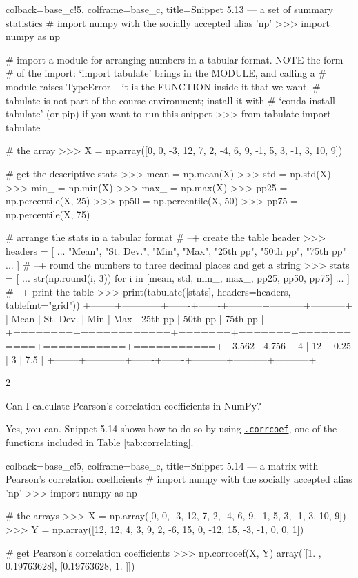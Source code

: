 \documentclass[a4paper,11pt]{book}
\newcommand{\question}[1]{%
    \begin{tcolorbox}[colback=comp_c!10,colframe=comp_c,sidebyside align=top,width=\linewidth,before skip=1ex]
        #1
    \end{tcolorbox}
    \switchcolumn%
}
\newcommand{\note}[1]{%
    \begin{tcolorbox}[colback=white!0,colframe=white!10,width=\linewidth,before skip=1ex]
        #1
    \end{tcolorbox}
}
\begin{document}
\begin{pythoncode}[linenos=true,]{colback=base_c!5, colframe=base_c, title=\sffamily Snippet 5.13 --- a set of summary statistics}
# import numpy with the socially accepted alias 'np'
>>> import numpy as np

# import a module for arranging numbers in a tabular format. NOTE the form
# of the import: `import tabulate' brings in the MODULE, and calling a
# module raises TypeError -- it is the FUNCTION inside it that we want.
# tabulate is not part of the course environment; install it with
# `conda install tabulate' (or pip) if you want to run this snippet
>>> from tabulate import tabulate

# the array
>>> X = np.array([0, 0, -3, 12, 7, 2, -4, 6, 9, -1, 5, 3, -1, 3, 10, 9])

# get the descriptive stats
>>> mean = np.mean(X)
>>> std = np.std(X)
>>> min_ = np.min(X)
>>> max_ = np.max(X)
>>> pp25 = np.percentile(X, 25)
>>> pp50 = np.percentile(X, 50)
>>> pp75 = np.percentile(X, 75)

# arrange the stats in a tabular format
# --+ create the table header
>>> headers = [
...     "Mean", "St. Dev.", "Min", "Max", "25th pp", "50th pp", "75th pp"
...     ]
# --+ round the numbers to three decimal places and get a string
>>> stats = [
...     str(np.round(i, 3)) for i in [mean, std, min_, max_, pp25, pp50, pp75]
...     ]
# --+ print the table
>>> print(tabulate([stats], headers=headers, tablefmt="grid"))
+--------+------------+-------+-------+-----------+-----------+-----------+
|   Mean |   St. Dev. |   Min |   Max |   25th pp |   50th pp |   75th pp |
+========+============+=======+=======+===========+===========+===========+
|  3.562 |      4.756 |    -4 |    12 |     -0.25 |         3 |       7.5 |
+--------+------------+-------+-------+-----------+-----------+-----------+
\end{pythoncode}

\begin{paracol}{2}
	\question{\raggedright Can I calculate Pearson's correlation coefficients in NumPy?}
	\note{Yes, you can. Snippet 5.14 shows how to do so by using \href{https://numpy.org/doc/stable/reference/generated/numpy.corrcoef.html}{\texttt{.corrcoef}}, one of the functions included in Table \ref{tab:correlating}.}
\end{paracol}

\begin{pythoncode}[linenos=true,]{colback=base_c!5, colframe=base_c, title=\sffamily Snippet 5.14 --- a matrix with Pearson's correlation coefficients}
# import numpy with the socially accepted alias 'np'
>>> import numpy as np

# the arrays
>>> X = np.array([0, 0, -3, 12, 7, 2, -4, 6, 9, -1, 5, 3, -1, 3, 10, 9])
>>> Y = np.array([12, 12, 4, 3, 9, 2, -6, 15, 0, -12, 15, -3, -1, 0, 0, 1])

# get Pearson's correlation coefficients
>>> np.corrcoef(X, Y)
array([[1.        , 0.19763628],
       [0.19763628, 1.        ]])
\end{pythoncode}
\end{document}
